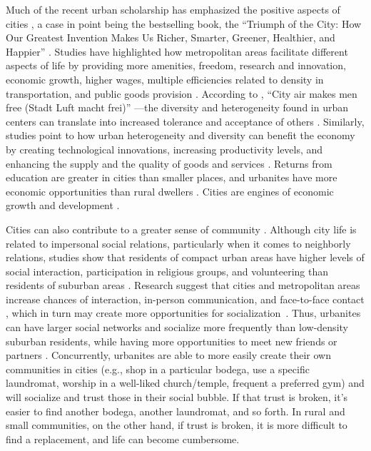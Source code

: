 \documentclass[11pt, letterpaper]{article}
\begin{document}
\begin{spacing}{1.4}
Much of the recent urban scholarship has emphasized the positive aspects of cities \citep{thrift05,amin06,aokCityBook15,peck16}, a case in point being the bestselling book, the ``Triumph of the City: How Our Greatest Invention Makes Us Richer, Smarter, Greener, Healthier,
and Happier'' \citep{glaeser11}.
Studies have highlighted how metropolitan areas facilitate different aspects of life by providing more amenities, freedom, research and innovation, economic growth, higher wages, multiple efficiencies related to density in transportation, and public goods provision \citep{tonnies57,osullivan09,meyer13,rosenthal02,bettencourt10,stansel2019,ahlfeldt2022,liu2020,smith2021}.
According to \cite{park84}, ``City air makes men free (Stadt Luft macht frei)'' \citep[p.12]{park84}---the diversity and heterogeneity found in urban centers can translate into increased tolerance and acceptance of others \citep{tuch87,wirth38,stephan82,aok20}. Similarly, studies point to how urban heterogeneity and diversity can benefit the economy by creating technological innovations, increasing productivity levels, and enhancing the supply and the quality of goods and services \citep{rodriguez2019does,rodriguez2020,mulligan2020}. Returns from education are greater in cities than smaller places, and urbanites have more economic opportunities than rural dwellers \citep{florida13,berry2005,storper2009,roca2017}. Cities are engines of economic growth and development \cite{osullivan09,carvalho2016,glaeser11}.  %

Cities can also contribute to a greater sense of community \citep[]{chavis2002sense,macke2019smart}. 
 Although city life is related to impersonal social relations, particularly when it comes to neighborly relations, studies show that residents of compact urban areas have higher levels of social interaction, participation in religious groups, and volunteering than residents of suburban areas \citep{nguyen10,mazumdar18,anon17-cities-oslo}. Research suggest that cities and metropolitan areas increase chances of interaction, in-person communication, and face-to-face contact \citep{carvalho2016,storper2004}, which in turn may create more opportunities for socialization~\citep{anon17-cities-oslo}. Thus, urbanites can have larger social networks and socialize more frequently than low-density suburban residents, while having more opportunities to meet new friends or partners \citep{mouratidis18,anon17-cities-oslo}.   
 Concurrently, urbanites are able to more easily create their own communities in cities (e.g., shop in a particular bodega, use a specific laundromat, worship in a well-liked church/temple, frequent a preferred gym) and will socialize and trust those in their social bubble. If that trust is broken, it's easier to find another bodega, another laundromat, and so forth. {In rural and small communities, on the other hand, if trust is broken, it is more difficult to find a replacement, and life can become cumbersome.}


\end{spacing}
\end{document}
